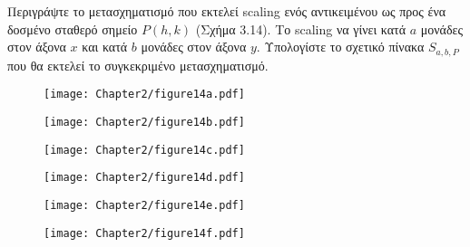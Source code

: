 \begin{example}
Περιγράψτε το μετασχηματισμό που εκτελεί scaling ενός αντικειμένου ως προς ένα δοσμένο σταθερό σημείο $P(h,k)$ (Σχήμα 3.14). Το scaling να γίνει κατά $a$ μονάδες στον άξονα $x$ και κατά $b$ μονάδες στον άξονα $y$. Υπολογίστε το σχετικό πίνακα $S_{a,b,P}$ που θα εκτελεί το συγκεκριμένο μετασχηματισμό.
\end{example}
\begin{solution}

	
\begin{figure}[h!]
	\begin{center}
		\begin{minipage}[b]{0.45\textwidth} %
		    \texttt{[image: Chapter2/figure14a.pdf]}
		\end{minipage}%
	\hfill
		\begin{minipage}[b]{0.45\textwidth} %
		    \texttt{[image: Chapter2/figure14b.pdf]}
		\end{minipage}
	\end{center}
\end{figure}

\begin{figure}[h!]
	\begin{center}
		\begin{minipage}[b]{0.45\textwidth} %
		    \texttt{[image: Chapter2/figure14c.pdf]}
		\end{minipage}%
	\hfill
		\begin{minipage}[b]{0.45\textwidth} %
		    \texttt{[image: Chapter2/figure14d.pdf]}
		\end{minipage}
	\end{center}
\end{figure}

\begin{figure}[h!]
	\begin{center}
		\begin{minipage}[b]{0.45\textwidth} %
		    \texttt{[image: Chapter2/figure14e.pdf]}
		\end{minipage}%
	\hfill
		\begin{minipage}[b]{0.45\textwidth} %
		    \texttt{[image: Chapter2/figure14f.pdf]}
		\end{minipage}
	\end{center}
\end{figure}


\end{solution}
